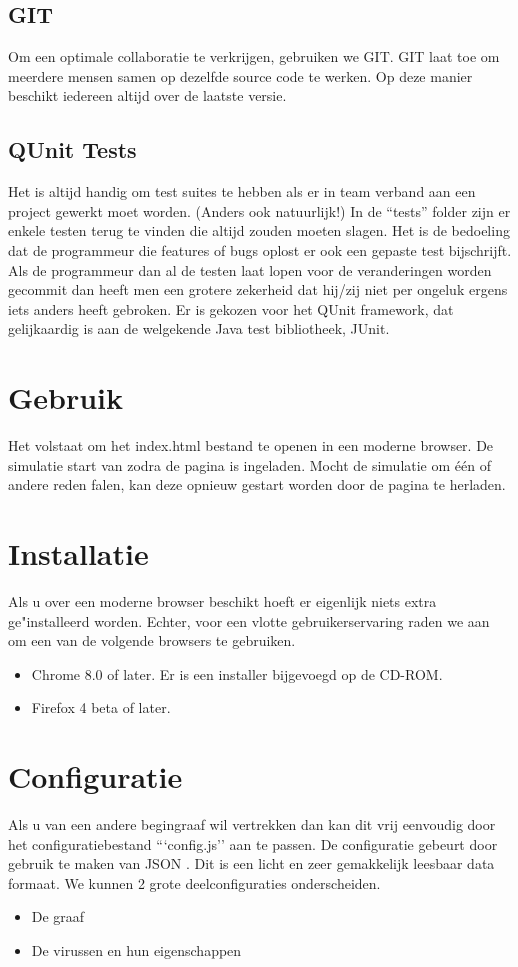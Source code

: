 \documentclass[a4paper,oneside]{report}
\begin{document}
\subsection{GIT}
Om een optimale collaboratie te verkrijgen, gebruiken we GIT.
GIT laat toe om meerdere mensen samen op dezelfde source code te werken.
Op deze manier beschikt iedereen altijd over de laatste versie.
\subsection{QUnit Tests}
Het is altijd handig om test suites te hebben als er in team verband aan een project gewerkt moet worden. (Anders ook natuurlijk!)
In de ``tests'' folder zijn er enkele testen terug te vinden die altijd zouden moeten slagen.
Het is de bedoeling dat de programmeur die features of bugs oplost er ook een gepaste test bijschrijft.
Als de programmeur dan al de testen laat lopen voor de veranderingen worden gecommit dan heeft men een 
grotere zekerheid dat hij/zij niet per ongeluk ergens iets anders heeft gebroken.
Er is gekozen voor het QUnit framework, dat gelijkaardig is aan de welgekende Java test bibliotheek, JUnit.

\section{Gebruik}
Het volstaat om het index.html bestand te openen in een moderne browser. De simulatie start van zodra de pagina is ingeladen.
Mocht de simulatie om \'{e}\'{e}n of andere reden falen, kan deze opnieuw gestart worden door de pagina te herladen.
\section{Installatie}
Als u over een moderne browser beschikt hoeft er eigenlijk niets extra ge"installeerd worden.
Echter, voor een vlotte gebruikerservaring raden we aan om een van de volgende browsers te gebruiken.
\begin{itemize}
\item Chrome 8.0 of later. Er is een installer bijgevoegd op de CD-ROM.
\item Firefox 4 beta of later.
\end{itemize}
\pagebreak
\section{Configuratie}
Als u van een andere begingraaf wil vertrekken dan kan dit vrij eenvoudig door het configuratiebestand ```config.js'' aan te passen.
De configuratie gebeurt door gebruik te maken van JSON \cite{JSON}. Dit is een licht en zeer gemakkelijk leesbaar data formaat.
We kunnen 2 grote deelconfiguraties onderscheiden.
\begin{itemize}
    \item De graaf
    \item De virussen en hun eigenschappen
\end{itemize}
\end{document}

